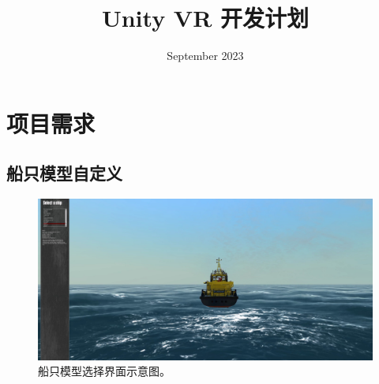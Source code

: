 \documentclass[letterpaper,10pt]{article}
\begin{document}
	
	
	\title{\songti {}Unity VR 开发计划}
	\date{\textrm{September 2023}}
	\maketitle
	
	\renewcommand{\figurename}{Figure} %
	\renewcommand{\contentsname}{Contents}
	\renewcommand{\tablename}{Table}
	\tableofcontents  %

	\section{项目需求}
	
		\subsection{船只模型自定义}
				
		\begin{figure}[htbp]
			\centering				\includegraphics[width=\columnwidth]{picture/Select a ship}
			\caption{
				\label{fig: Select a ship} 
				船只模型选择界面示意图。
			}	
		\end{figure}
	
\end{document}
